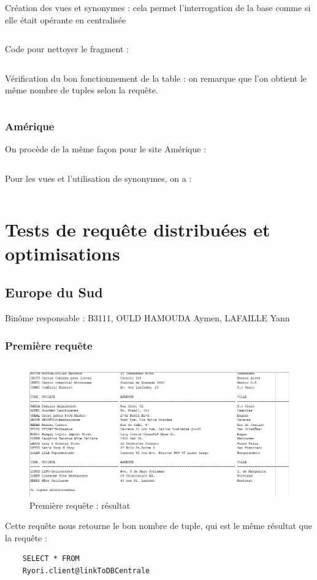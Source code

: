 \documentclass[10pt,a4paper]{article}
\theoremstyle{plain}
\begin{document}
Création des vues et synonymes : cela permet l'interrogation de la base comme si elle était opérante en centralisée

\inputminted{sql}{EUS_III-C-7.sql}
\newpage

Code pour nettoyer le fragment :
\inputminted{sql}{EUS_III-C-8.sql}
\newpage

Vérification du bon fonctionnement de la table : on remarque que l'on obtient le même nombre de tuples selon la requête.
\inputminted{sql}{EUS_III-C-9.sql}
\newpage 

\subsubsection{Amérique}
On procède de la même façon pour le site Amérique :
\inputminted{sql}{AM_SFW.sql}
\newpage 

Pour les vues et l'utilisation de synonymes, on a :
\inputminted{sql}{AM_Vues.sql}
\newpage

\section{Tests de requête distribuées et optimisations}
\subsection{Europe du Sud}
Binôme responsable : B3111, OULD HAMOUDA Aymen, LAFAILLE Yann

\subsubsection{Première requête}
\inputminted{sql}{EUS_IV-A-1.sql}
\begin{figure}[!h]
    \centering
    \includegraphics[width=15cm]{EUS_req1.PNG}
    \caption{Première requête : résultat}
\end{figure}
Cette requête nous retourne le bon nombre de tuple, qui est le même résultat que la requête :
\begin{verbatim}
    SELECT * FROM
    Ryori.client@linkToDBCentrale
\end{verbatim}
\end{document}
